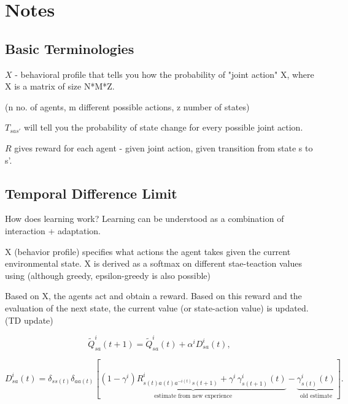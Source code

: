

\section{Notes}


\subsection{Basic Terminologies}

$X$ - behavioral profile that tells you how the probability of "joint action" X, where X is a matrix of size N*M*Z. 

(n \rightarrow no. of agents, m \rightarrow different possible actions, z \rightarrow number of states) 

$T_{sas'}$ will tell you the probability of state change for every possible joint action.

$R$ gives reward for each agent - given joint action, given transition from state s to s'.

\subsection{Temporal Difference Limit}

How does learning work?  Learning can be understood as a combination of interaction + adaptation.

X (behavior profile) specifies what actions the agent takes given the current environmental state. X is derived as a softmax on different stae-teaction values using (although greedy, epsilon-greedy is also possible)

Based on X, the agents act and obtain a reward. Based on this reward and the evaluation of the next state, the current value (or state-action value) is updated.  (TD update)

\begin{equation}
\tilde{Q}_{sa}^i(t+1) = \tilde{Q}_{sa}^i(t) + \alpha^i D_{sa}^i(t),
\end{equation}




\begin{equation}
D_{sa}^i(t) = \delta_{ss(t)} \delta_{aa(t)} 
\left[
    \underbrace{(1 - \gamma^i) R_{s(t)a(t)a^{-i(t)}s(t+1)}^i + \gamma^i \, \gamma_{s(t+1)}^i (t)}_{\text{estimate from new experience}} 
    - \underbrace{\gamma_{s(t)}^i (t)}_{\text{old estimate}}
\right].
\end{equation}




